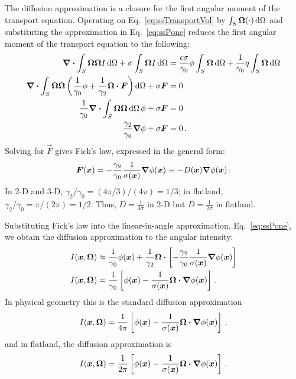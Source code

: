 The diffusion approximation is a closure for the first angular moment of
the transport equation. Operating on Eq.~\eqref{eq:ssTransportVol} by
$\int_S \bm{\Omega} (\cdot) \mathop{}\!\mathrm{d}\Omega$ and substituting
the approximation in Eq.~\eqref{eq:ssPone} reduces the first angular moment of
the transport equation to the following:
\begin{align*}
  \bm{\nabla} \bm{\cdot} \int_S \bm{\Omega} \bm{\Omega} I
  \mathop{}\!\mathrm{d}\Omega
  + \sigma \int_S \bm{\Omega} I \mathop{}\!\mathrm{d}\Omega
  &=
  \frac{c\sigma}{\gamma_0} \phi \int_S \bm{\Omega} \mathop{}\!\mathrm{d}\Omega
  + \frac{1}{\gamma_0} q \int_S \bm{\Omega} \mathop{}\!\mathrm{d}\Omega
  \\
  \bm{\nabla} \bm{\cdot} \int_S \bm{\Omega} \bm{\Omega} \left(
  \frac{1}{\gamma_0}\phi + \frac{1}{\gamma_2} \bm{\Omega} \bm{\cdot} \bm{F}
  \right)
  \mathop{}\!\mathrm{d}\Omega
  + \sigma \bm{F}
  &= 0
  \\
  \frac{1}{\gamma_0} \bm{\nabla} \bm{\cdot} \int_S \bm{\Omega} \bm{\Omega}
  \mathop{}\!\mathrm{d}\Omega\, \phi 
  + \sigma \bm{F} &= 0
  \\
  \frac{\gamma_2}{\gamma_0} \bm{\nabla} \phi + \sigma \bm{F} &= 0 \,.
\end{align*}
Solving for $\vec{F}$ gives Fick's law, expressed in the general form:
\begin{equation} \label{eq:fickGeneral}
  \bm{F}(\bm{x})
  = - \frac{\gamma_2}{\gamma_0} \frac{1}{\sigma(\bm{x})} \bm{\nabla} \phi(\bm{x})
  \equiv -D(\bm{x}) \bm{\nabla} \phi(\bm{x})\,.
\end{equation}
In 2-D and 3-D, $\gamma_2/\gamma_0 = (4\pi / 3) / (4\pi) = 1/3$; in
flatland, $\gamma_2/\gamma_0 = \pi / (2\pi) = 1/2$. Thus, $D=\frac{1}{3\sigma}$ in
2-D but $D=\frac{1}{2\sigma}$ in flatland.

Substituting Fick's law into the linear-in-angle approximation,
Eq.~\eqref{eq:ssPone}, we obtain the diffusion approximation to the angular
intensity:
\begin{align} \nonumber
  I(\bm{x}, \bm{\Omega})
  &\approx \frac{1}{\gamma_0} \phi(\bm{x})
  + \frac{1}{\gamma_2} \bm{\Omega} \bm{\cdot} \left[ - \frac{\gamma_2}{\gamma_0}
  \frac{1}{\sigma(\bm{x})} \bm{\nabla} \phi(\bm{x}) \right]
  \\ \label{eq:diffusionIntensity}
  I(\bm{x}, \bm{\Omega})
  &= \frac{1}{\gamma_0} \left[ \phi(\bm{x})
  - \frac{1}{\sigma(\bm{x})}
  \bm{\Omega} \bm{\cdot} \bm{\nabla} \phi(\bm{x}) \right] \,.
\end{align}
In physical geometry this is the standard diffusion approximation
\begin{equation*}
 I(\bm{x}, \bm{\Omega})
= \frac{1}{4\pi} \left[ \phi(\bm{x}) - \frac{1}{\sigma(\bm{x})} \bm{\Omega}
\bm{\cdot} \bm{\nabla} \phi(\bm{x}) \right] \,,
\end{equation*}
and in flatland, the diffusion approximation is
\begin{equation}\label{eq:flatlandDiffusion}
 I(\bm{x}, \bm{\Omega})
= \frac{1}{2\pi} \left[ \phi(\bm{x}) - \frac{1}{\sigma(\bm{x})} \bm{\Omega}
\bm{\cdot} \bm{\nabla} \phi(\bm{x}) \right]\,.
\end{equation}

